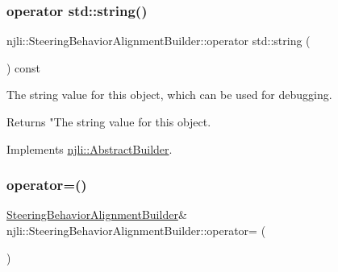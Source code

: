 \subsubsection{\texorpdfstring{operator std\+::string()}{operator std::string()}}
{\footnotesize\ttfamily njli\+::\+Steering\+Behavior\+Alignment\+Builder\+::operator std\+::string (\begin{DoxyParamCaption}{ }\end{DoxyParamCaption}) const\hspace{0.3cm}{\ttfamily [virtual]}}

The string value for this object, which can be used for debugging.

\begin{DoxyReturn}{Returns}
"The string value for this object. 
\end{DoxyReturn}


Implements \mbox{\hyperlink{classnjli_1_1_abstract_builder_a3e6e553e06d1ca30517ad5fb0bd4d000}{njli\+::\+Abstract\+Builder}}.

\mbox{\label{classnjli_1_1_steering_behavior_alignment_builder_ab2ce565d5e2d34b64c63b1998cd76a39}} 
\subsubsection{\texorpdfstring{operator=()}{operator=()}}
{\footnotesize\ttfamily \mbox{\hyperlink{classnjli_1_1_steering_behavior_alignment_builder}{Steering\+Behavior\+Alignment\+Builder}}\& njli\+::\+Steering\+Behavior\+Alignment\+Builder\+::operator= (\begin{DoxyParamCaption}\item[{const \mbox{\hyperlink{classnjli_1_1_steering_behavior_alignment_builder}{Steering\+Behavior\+Alignment\+Builder}} \&}]{ }\end{DoxyParamCaption})\hspace{0.3cm}{\ttfamily [protected]}}

\mbox{\label{classnjli_1_1_steering_behavior_alignment_builder_a3cbfb826f38059003573c24a1f86b1ea}} 
